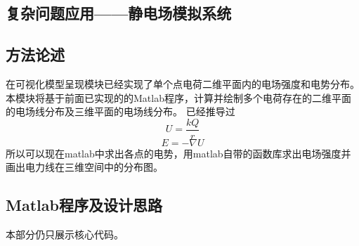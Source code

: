 \documentclass[UTF8]{article}
\numberwithin{figure}{subsection}
\numberwithin{table}{subsection}
\begin{document}
\begin{multicols}{2}
	\section{复杂问题应用——静电场模拟系统}
	\subsection{方法论述}
	\par 在可视化模型呈现模块已经实现了单个点电荷二维平面内的电场强度和电势分布。本模块将基于前面已实现的的Matlab程序，计算并绘制多个电荷存在的二维平面的电场线分布及三维平面的电场线分布。
	已经推导过
	$$U = \frac{kQ}{r}$$
	$$E = -\nabla U$$
	所以可以现在matlab中求出各点的电势，用matlab自带的函数库求出电场强度并画出电力线在三维空间中的分布图。
	\subsection{Matlab程序及设计思路}
	\par 本部分仍只展示核心代码。

\end{multicols}
\end{document}
